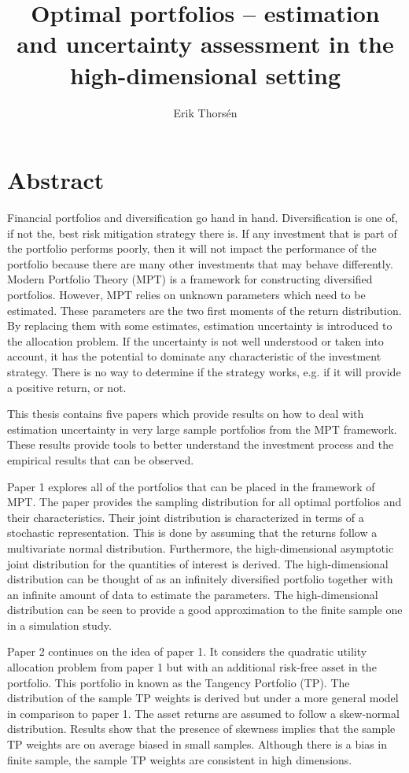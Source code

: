 \documentclass[12pt, oneside]{book}\usepackage{knitr}
\title{Optimal portfolios -- estimation and uncertainty assessment in the high-dimensional setting}
\author{Erik Thorsén}
\begin{document}


\maketitle


\chapter*{\centering Abstract}
{\small
Financial portfolios and diversification go hand in hand.
Diversification is one of, if not the, best risk mitigation strategy there is.
If any investment that is part of the portfolio performs poorly, then it will not impact the performance of the portfolio because there are many other investments that may behave differently.
Modern Portfolio Theory (MPT) is a framework for constructing diversified portfolios.
However, MPT relies on unknown parameters which need to be estimated. 
These parameters are the two first moments of the return distribution.
By replacing them with some estimates, estimation uncertainty is introduced to the allocation problem.
If the uncertainty is not well understood or taken into account, it has the potential to dominate any characteristic of the investment strategy.
There is no way to determine if the strategy works, e.g. if it will provide a positive return, or not.

This thesis contains five papers which provide results on how to deal with estimation uncertainty in very large sample portfolios from the MPT framework.
These results provide tools to better understand the investment process and the empirical results that can be observed.

Paper 1 explores all of the portfolios that can be placed in the framework of MPT. 
The paper provides the sampling distribution for all optimal portfolios and their characteristics.
Their joint distribution is characterized in terms of a stochastic representation.
This is done by assuming that the returns follow a multivariate normal distribution.
Furthermore, the high-dimensional asymptotic joint distribution for the quantities of interest is derived.
The high-dimensional distribution can be thought of as an infinitely diversified portfolio together with an infinite amount of data to estimate the parameters.
The high-dimensional distribution can be seen to provide a good approximation to the finite sample one in a simulation study.

Paper 2 continues on the idea of paper 1.
It considers the quadratic utility allocation problem from paper 1 but with an additional risk-free asset in the portfolio.
This portfolio in known as the Tangency Portfolio (TP).
The distribution of the sample TP weights is derived but under a more general model in comparison to paper 1. 
The asset returns are assumed to follow a skew-normal distribution.
Results show that the presence of skewness implies that the sample TP weights are on average biased in small samples.
Although there is a bias in finite sample, the sample TP weights are consistent in high dimensions.

}
\end{document}
